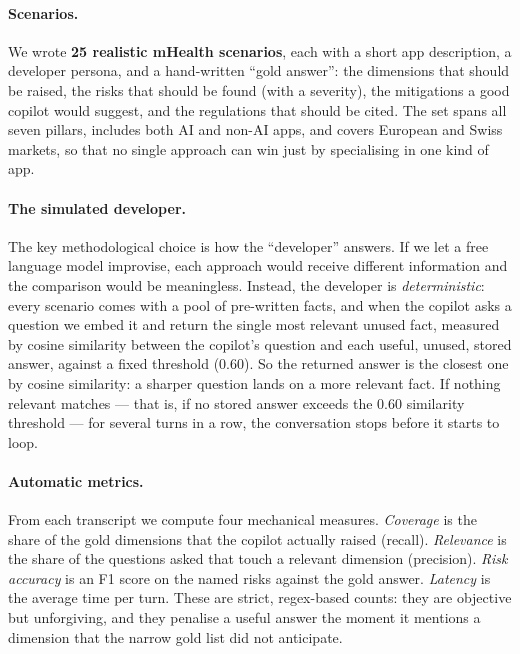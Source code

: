 \documentclass[11pt]{article}
\begin{document}
\paragraph{Scenarios.}
We wrote \textbf{25 realistic mHealth scenarios}, each with a short app description, a
developer persona, and a hand-written ``gold answer'': the dimensions that should be
raised, the risks that should be found (with a severity), the mitigations a good copilot
would suggest, and the regulations that should be cited. The set spans all seven pillars,
includes both AI and non-AI apps, and covers European and Swiss markets, so that no single
approach can win just by specialising in one kind of app.

\paragraph{The simulated developer.}
The key methodological choice is how the ``developer'' answers. If we let a free language
model improvise, each approach would receive different information and the comparison
would be meaningless. Instead, the developer is \emph{deterministic}: every scenario comes
with a pool of pre-written facts, and when the copilot asks a question we embed it and
return the single most relevant unused fact, measured by cosine similarity between the
copilot's question and each useful, unused, stored answer, against a fixed threshold
(0.60). So the returned answer is the closest one by cosine similarity: a sharper question
lands on a more relevant fact. If nothing relevant matches --- that is, if no stored answer
exceeds the 0.60 similarity threshold --- for several turns in a row, the conversation
stops before it starts to loop.

\paragraph{Automatic metrics.}
From each transcript we compute four mechanical measures. \emph{Coverage} is the share of
the gold dimensions that the copilot actually raised (recall). \emph{Relevance} is the
share of the questions asked that touch a relevant dimension (precision). \emph{Risk
accuracy} is an F1 score on the named risks against the gold answer. \emph{Latency} is the
average time per turn. These are strict, regex-based counts: they are objective but
unforgiving, and they penalise a useful answer the moment it mentions a dimension that the
narrow gold list did not anticipate.
\end{document}

